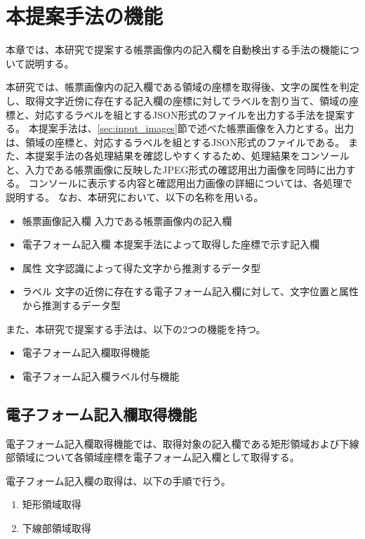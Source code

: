 \chapter{本提案手法の機能}\label{cha:Function}
本章では、本研究で提案する帳票画像内の記入欄を自動検出する手法の機能について説明する。

本研究では、帳票画像内の記入欄である領域の座標を取得後、文字の属性を判定し、取得文字近傍に存在する記入欄の座標に対してラベルを割り当て、領域の座標と、対応するラベルを組とするJSON形式のファイルを出力する手法を提案する。
本提案手法は、\ref{sec:input_images}節で述べた帳票画像を入力とする。出力は、領域の座標と、対応するラベルを組とするJSON形式のファイルである。
また、本提案手法の各処理結果を確認しやすくするため、処理結果をコンソールと、入力である帳票画像に反映したJPEG形式の確認用出力画像を同時に出力する。
コンソールに表示する内容と確認用出力画像の詳細については、各処理で説明する。
なお、本研究において、以下の名称を用いる。

\begin{itemize}
	\item 帳票画像記入欄
  		入力である帳票画像内の記入欄
	\item 電子フォーム記入欄
		本提案手法によって取得した座標で示す記入欄
	\item 属性
		文字認識によって得た文字から推測するデータ型
	\item ラベル
		文字の近傍に存在する電子フォーム記入欄に対して、文字位置と属性から推測するデータ型
\end{itemize}

また、本研究で提案する手法は、以下の2つの機能を持つ。

\begin{itemize}
  \item 電子フォーム記入欄取得機能
  \item 電子フォーム記入欄ラベル付与機能
\end{itemize}


\section{電子フォーム記入欄取得機能}\label{sec:eform_write_space_obtainment_feature}
電子フォーム記入欄取得機能では、取得対象の記入欄である矩形領域および下線部領域について各領域座標を電子フォーム記入欄として取得する。

電子フォーム記入欄の取得は、以下の手順で行う。

\begin{enumerate}
  \item 矩形領域取得
  \item 下線部領域取得
\end{enumerate}

